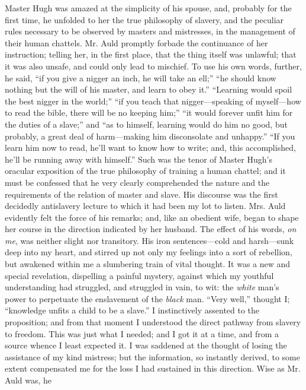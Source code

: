 Master Hugh was amazed at the simplicity of his spouse, and, probably
for the first time, he unfolded to her the true philosophy of slavery,
and the peculiar rules necessary to be observed by masters and
mistresses, in the management of their human chattels. Mr. Auld promptly
forbade the continuance of her instruction; telling her, in the first
place, that the thing itself was unlawful; that it was also unsafe, and
could only lead to mischief. To use his own words,
{\protect\hypertarget{146}{}{}}further, he said, ``if you give a nigger
an inch, he will take an ell;'' ``he should know nothing but the will of
his master, and learn to obey it.'' ``Learning would spoil the best
nigger in the world;'' ``if you teach that nigger---speaking of
myself---how to read the bible, there will be no keeping him;'' ``it
would forever unfit him for the duties of a slave;'' and ``as to
himself, learning would do him no good, but probably, a great deal of
harm---making him disconsolate and unhappy.'' ``If you learn him now to
read, he'll want to know how to write; and, this accomplished, he'll be
running away with himself.'' Such was the tenor of Master Hugh's
oracular exposition of the true philosophy of training a human chattel;
and it must be confessed that he very clearly comprehended the nature
and the requirements of the relation of master and slave. His discourse
was the first decidedly antislavery lecture to which it had been my lot
to listen. Mrs. Auld evidently felt the force of his remarks; and, like
an obedient wife, began to shape her course in the direction indicated
by her husband. The effect of his words, \emph{on me}, was neither
slight nor transitory. His iron sentences---cold and harsh---sunk deep
into my heart, and stirred up not only my feelings into a sort of
rebellion, but awakened within me a slumbering train of vital thought.
It was a new and special revelation, dispelling a painful mystery,
against which my youthful understanding had struggled, and struggled in
vain, to wit: the \emph{white} man's power to perpetuate the enslavement
of the \emph{black} man. ``Very well,'' thought I; ``knowledge unfits a
child to be a slave.'' I instinctively assented to the proposition;
{\protect\hypertarget{147}{}{}}and from that moment I understood the
direct pathway from slavery to freedom. This was just what I needed; and
I got it at a time, and from a source whence I least expected it. I was
saddened at the thought of losing the assistance of my kind mistress;
but the information, so instantly derived, to some extent compensated me
for the loss I had sustained in this direction. Wise as Mr. Auld was, he

